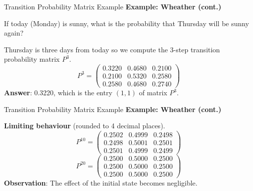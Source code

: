 \documentclass[8pt]{beamer}
\begin{document}
\begin{frame}{Transition Probability Matrix Example}
\textbf{Example: Wheather (cont.)}

\vspace{3mm}

If today (Monday) is sunny, what is the probability that Thursday will be sunny again?

Thursday is three days from today so we compute the 3-step transition probability matrix $P^3$.
\begin{equation*}
P^3=\left( 
\begin{array}{ccc}
0.3220&0.4680& 0.2100 \\
0.2100&0.5320& 0.2580\\
0.2580& 0.4680& 0.2740
\end{array}
\right)
\end{equation*}
\textbf{Answer}: 0.3220, which is the entry $(1,1)$ of matrix $P^3$.
\end{frame}

\begin{frame}{Transition Probability Matrix Example}
\textbf{Example: Wheather (cont.)}

\vspace{3mm}

\textbf{Limiting behaviour} (rounded to 4 decimal places).
\begin{equation*}
P^{10}=\left( 
\begin{array}{ccc}
0.2502&0.4999& 0.2498 \\
0.2498&0.5001& 0.2501\\
0.2501& 0.4999& 0.2499
\end{array}
\right)
\end{equation*}
\begin{equation*}
P^{20}=\left( 
\begin{array}{ccc}
0.2500&0.5000& 0.2500 \\
0.2500&0.5000& 0.2500\\
0.2500& 0.5000& 0.2500
\end{array}
\right)
\end{equation*}
\textbf{Observation}: The effect of the initial state becomes negligible.
\end{frame}
\end{document}
